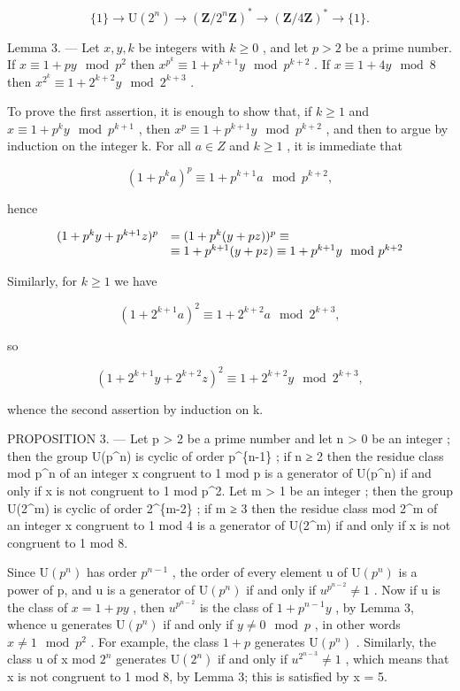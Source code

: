 \[
\{1 \} \rightarrow \mathrm{U} (2 ^ {n}) \rightarrow (\mathbf {Z} / 2 ^ {n} \mathbf {Z}) ^ {*} \rightarrow (\mathbf {Z} / 4 \mathbf {Z}) ^ {*} \rightarrow \{1 \}.\tag{4}
\]

Lemma 3. --- Let \(x, y, k\) be integers with \(k \geqslant 0\) , and let \(p > 2\) be a prime number. If \(x \equiv 1 + py \mod p^2\) then \(x^{p^k} \equiv 1 + p^{k+1}y \mod p^{k+2}\) . If \(x \equiv 1 + 4y \mod 8\) then \(x^{2^k} \equiv 1 + 2^{k+2}y \mod 2^{k+3}\) .

To prove the first assertion, it is enough to show that, if \(k \geqslant 1\) and \(x \equiv 1 + p^{k}y \mod p^{k+1}\) , then \(x^{p} \equiv 1 + p^{k+1}y \mod p^{k+2}\) , and then to argue by induction on the integer k. For all \(a \in Z\) and \(k \geqslant 1\) , it is immediate that

\[
(1 + p ^ {k} a) ^ {p} \equiv 1 + p ^ {k + 1} a \mod p ^ {k + 2},
\]

hence

\[
\begin{array}{r l} (1 + p ^ {k} y + p ^ {k + 1} z) ^ {p} & = (1 + p ^ {k} (y + p z)) ^ {p} \equiv \\ & \equiv 1 + p ^ {k + 1} (y + p z) \equiv 1 + p ^ {k + 1} y \mod p ^ {k + 2} \end{array}
\]

Similarly, for \(k \geqslant 1\) we have

\[
(1 + 2 ^ {k + 1} a) ^ {2} \equiv 1 + 2 ^ {k + 2} a \mod 2 ^ {k + 3},
\]

so

\[
(1 + 2 ^ {k + 1} y + 2 ^ {k + 2} z) ^ {2} \equiv 1 + 2 ^ {k + 2} y \mod 2 ^ {k + 3},
\]

whence the second assertion by induction on k.

PROPOSITION 3. --- Let p \textgreater{} 2 be a prime number and let n \textgreater{} 0 be an integer ; then the group U(p\^{}n) is cyclic of order p\^{}\{n-1\} ; if n ≥ 2 then the residue class mod p\^{}n of an integer x congruent to 1 mod p is a generator of U(p\^{}n) if and only if x is not congruent to 1 mod p\^{}2. Let m \textgreater{} 1 be an integer ; then the group U(2\^{}m) is cyclic of order 2\^{}\{m-2\} ; if m ≥ 3 then the residue class mod 2\^{}m of an integer x congruent to 1 mod 4 is a generator of U(2\^{}m) if and only if x is not congruent to 1 mod 8.

Since \(\mathrm{U}(p^{n})\) has order \(p^{n-1}\) , the order of every element u of \(\mathrm{U}(p^{n})\) is a power of p, and u is a generator of \(\mathrm{U}(p^{n})\) if and only if \(u^{p^{n-2}} \neq 1\) . Now if u is the class of \(x = 1 + py\) , then \(u^{p^{n-2}}\) is the class of \(1 + p^{n-1}y\) , by Lemma 3, whence u generates \(\mathrm{U}(p^{n})\) if and only if \(y \neq 0 \mod p\) , in other words \(x \neq 1 \mod p^{2}\) . For example, the class \(1 + p\) generates \(\mathrm{U}(p^{n})\) . Similarly, the class u of x mod \(2^{n}\) generates \(\mathrm{U}(2^{n})\) if and only if \(u^{2^{n-3}} \neq 1\) , which means that x is not congruent to 1 mod 8, by Lemma 3; this is satisfied by x = 5.

